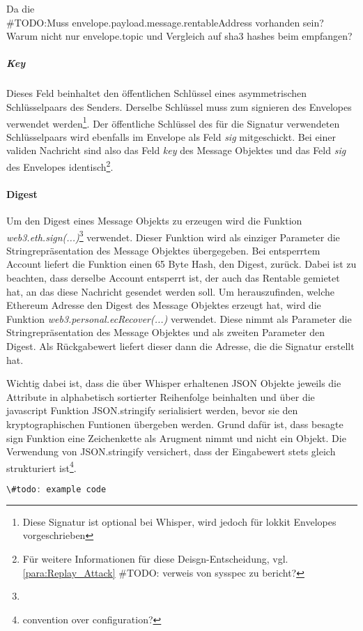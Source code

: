 Da die 
\\\#TODO:Muss envelope.payload.message.rentableAddress vorhanden sein? Warum nicht nur envelope.topic und Vergleich auf sha3 hashes beim empfangen?

\subparagraph{Key}
\label{sys_para:Key}
Dieses Feld beinhaltet den öffentlichen Schlüssel eines asymmetrischen Schlüsselpaars des Senders. Derselbe Schlüssel muss zum signieren des Envelopes verwendet werden\footnote{Diese Signatur ist optional bei Whisper, wird jedoch für lokkit Envelopes vorgeschrieben}. Der öffentliche Schlüssel des für die Signatur verwendeten Schlüsselpaars wird ebenfalls im Envelope als Feld \emph{sig} mitgeschickt. Bei einer validen Nachricht sind also das Feld \emph{key} des Message Objektes und das Feld \emph{sig} des Envelopes identisch\footnote{Für weitere Informationen für diese Deisgn-Entscheidung, vgl. \ref{para:Replay_Attack} \#TODO: verweis von sysspec zu bericht?}.

\paragraph{Digest}
\label{sys_para:Digest}
Um den Digest eines Message Objekts zu erzeugen wird die Funktion \emph{web3.eth.sign(...)}\footnote{} verwendet. Dieser Funktion wird als einziger Parameter die Stringrepräsentation des Message Objektes übergegeben. Bei entsperrtem Account liefert die Funktion einen 65 Byte Hash, den Digest, zurück. Dabei ist zu beachten, dass derselbe Account entsperrt ist, der auch das Rentable gemietet hat, an das diese Nachricht gesendet werden soll. Um herauszufinden, welche Ethereum Adresse den Digest des Message Objektes erzeugt hat, wird die Funktion \emph{web3.personal.ecRecover(...)} verwendet. Diese nimmt als Parameter die Stringrepräsentation des Message Objektes und als zweiten Parameter den Digest. Als Rückgabewert liefert dieser dann die Adresse, die die Signatur erstellt hat.

Wichtig dabei ist, dass die über Whisper erhaltenen JSON Objekte jeweils die Attribute in alphabetisch sortierter Reihenfolge beinhalten und über die javascript Funktion JSON.stringify serialisiert werden, bevor sie den kryptographischen Funtionen übergeben werden. Grund dafür ist, dass besagte sign Funktion eine Zeichenkette als Arugment nimmt und nicht ein Objekt. Die Verwendung von JSON.stringify versichert, dass der Eingabewert stets gleich strukturiert ist\footnote{convention over configuration?}.

\begin{lstlisting}[language=javascript,caption={beispiel generate digest und ecRecover}]
\#todo: example code
\end{lstlisting}


